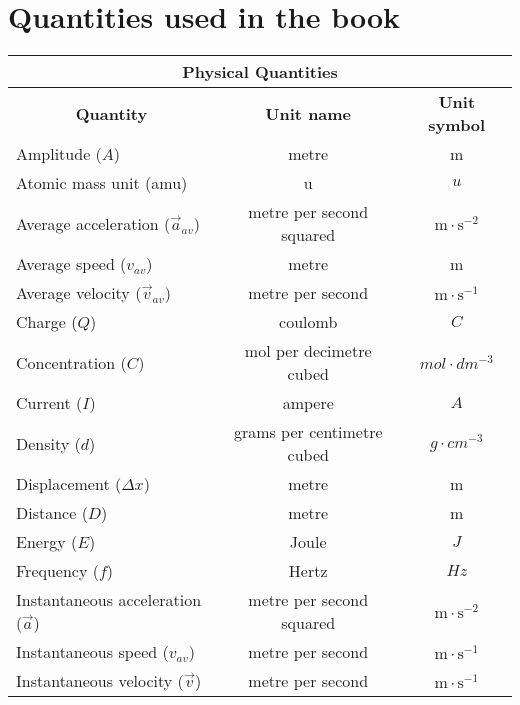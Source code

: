 \section{Quantities used in the book}
\small{
\begin{table}[H]
\begin{center}
\begin{tabular}{|l|c|c|}\hline \hline 
\multicolumn{3}{|c|}{\textbf{Physical Quantities}}\\ \hline \hline
\multicolumn{1}{|c|}{\textbf{Quantity}} & \textbf{Unit name} & \textbf{Unit symbol}\\ \hline
Amplitude ($A$)             & metre & m                              \\ \hline
Atomic mass unit (amu)               & u & $u$  \\ \hline
Average acceleration ($\vec{a}_{av}$)  & metre per second squared & $\text{m} \cdot \text{s}^{-2}$  \\ \hline
Average speed ($v_{av}$)        & metre & m                               \\ \hline
Average velocity ($\vec{v}_{av}$)  & metre per second & $\text{m} \cdot \text{s}^{-1}$  \\ \hline
Charge ($Q$)             & coulomb                   &  $C$                \\ \hline
Concentration ($C$)             & mol per decimetre cubed & $mol \cdot dm^{-3}$  \\ \hline
Current ($I$)             & ampere & $A$                             \\ \hline
Density ($d$)                & grams per centimetre cubed & $g \cdot cm^{-3}$           \\ \hline
Displacement ($\Delta x$)      & metre  & m                                \\ \hline
Distance ($D$)             & metre & m                               \\ \hline
Energy ($E$)             & Joule & $J$ \\ \hline
Frequency ($f$)             & Hertz &  $Hz$   \\ \hline
Instantaneous acceleration ($\vec{a}$)  & metre per second squared & $\text{m} \cdot \text{s}^{-2}$ \\ \hline
Instantaneous speed (${v}_{av}$)      & metre per second & $\text{m} \cdot \text{s}^{-1}$  \\ \hline
Instantaneous velocity ($\vec{v}$)       & metre per second & $\text{m} \cdot \text{s}^{-1}$  \\ \hline

\end{tabular}
\end{center}
\end{table}}
